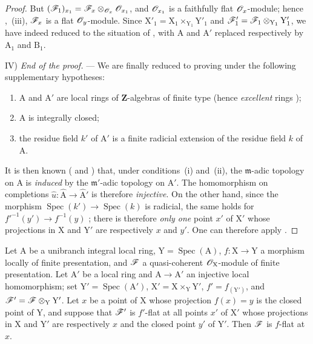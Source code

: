 \begin{proof}
But $(\mathscr{F}_1)_{x_1}=\mathscr{F}_x\otimes_{\mathscr{O}_x}\mathscr{O}_{x_1}$, and $\mathscr{O}_{x_1}$ is a faithfully flat $\mathscr{O}_x$-module; hence ,~(iii), $\mathscr{F}_x$ is a flat $\mathscr{O}_y$-module.
Since $\mathrm{X}'_1=\mathrm{X}_1\times_{\mathrm{Y}_1}\mathrm{Y}'_1$ and $\mathscr{F}'_1=\mathscr{F}_1\otimes_{\mathrm{Y}_1}\mathrm{Y}'_1$, we have indeed reduced to the situation of , with $\mathrm{A}$ and $\mathrm{A}'$ replaced respectively by $\mathrm{A}_1$ and $\mathrm{B}_1$.

\medskip
\noindent IV) \emph{End of the proof.} --- We are finally reduced to proving  under the following supplementary hypotheses:
\begin{enumerate}[label=(\roman*)]
  \item $\mathrm{A}$ and $\mathrm{A}'$ are local rings of $\mathbf{Z}$-algebras of finite type (hence \emph{excellent} rings );
  \item $\mathrm{A}$ is integrally closed;
  \item the residue field $k'$ of $\mathrm{A}'$ is a finite radicial extension of the residue field $k$ of $\mathrm{A}$.
\end{enumerate}
It is then known ( and ) that, under conditions~(i) and~(ii), the $\mathfrak{m}$-adic topology on $\mathrm{A}$ is \emph{induced} by the $\mathfrak{m}'$-adic topology on $\mathrm{A}'$.
The homomorphism on completions $\widehat{u}:\widehat{\mathrm{A}}\to\widehat{\mathrm{A}}'$ is therefore \emph{injective}.
On the other hand, since the morphism $\operatorname{Spec}(k')\to\operatorname{Spec}(k)$ is radicial, the same holds for $f'^{-1}(y')\to f^{-1}(y)$ ; there is therefore \emph{only one} point $x'$ of $\mathrm{X}'$ whose projections in $\mathrm{X}$ and $\mathrm{Y}'$ are respectively $x$ and $y'$.
One can therefore apply .
\end{proof}

\begin{corollary}[11.6.2]
\label{IV.11.6.2}
Let $\mathrm{A}$ be a unibranch integral local ring, $\mathrm{Y}=\operatorname{Spec}(\mathrm{A})$, $f:\mathrm{X}\to\mathrm{Y}$ a morphism locally of finite presentation, and $\mathscr{F}$ a quasi-coherent $\mathscr{O}_\mathrm{X}$-module of finite presentation.
Let $\mathrm{A}'$ be a local ring and $\mathrm{A}\to\mathrm{A}'$ an injective local homomorphism; set $\mathrm{Y}'=\operatorname{Spec}(\mathrm{A}')$, $\mathrm{X}'=\mathrm{X}\times_\mathrm{Y}\mathrm{Y}'$, $f'=f_{(\mathrm{Y}')}$, and $\mathscr{F}'=\mathscr{F}\otimes_\mathrm{Y}\mathrm{Y}'$.
Let $x$ be a point of $\mathrm{X}$ whose projection $f(x)=y$ is the closed point of $\mathrm{Y}$, and suppose that $\mathscr{F}'$ is $f'$-flat at \textup{all} points $x'$ of $\mathrm{X}'$ whose projections in $\mathrm{X}$ and $\mathrm{Y}'$ are respectively $x$ and the closed point $y'$ of $\mathrm{Y}'$.
Then $\mathscr{F}$ is $f$-flat at $x$.
\end{corollary}

